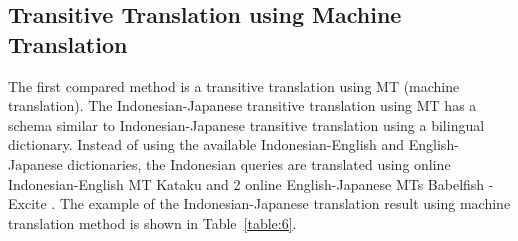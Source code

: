 \documentclass[english]{jnlp_1.3c}
\begin{document}
\subsection{Transitive Translation using Machine Translation}
The first compared method is a transitive translation using MT (machine
translation). The Indonesian-Japanese transitive translation using MT
has a schema similar to Indonesian-Japanese transitive translation using
a bilingual dictionary. Instead of using the available
Indonesian-English and English-Japanese dictionaries, the Indonesian
queries are translated using online Indonesian-English MT Kataku \cite{kataku}
and 2 online English-Japanese MTs Babelfish \cite{babelfish}-Excite \cite{excite}. The example
of the Indonesian-Japanese translation result using machine translation
method is shown in Table~\ref{table:6}.
\end{document}
